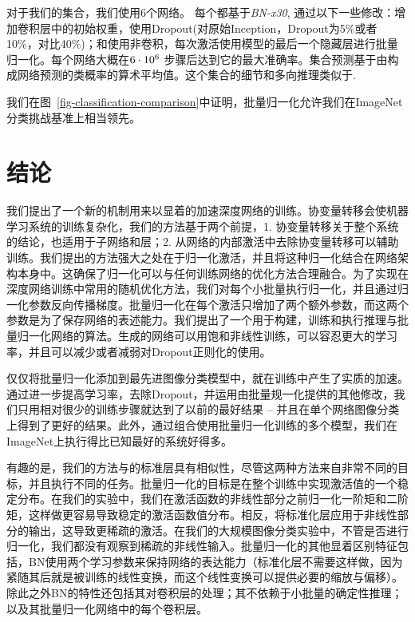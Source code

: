 \documentclass[twocolumn]{article}
\begin{document}

对于我们的集合，我们使用6个网络。 每个都基于{\sl BN-x30},
通过以下一些修改：增加卷积层中的初始权重，使用Dropout(对原始Inception，Dropout为5\%或者10\%，对比40\%)；和使用非卷积，每次激活使用模型的最后一个隐藏层进行批量归一化。每个网络大概在$6\cdot 10^6$ 步骤后达到它的最大准确率。集合预测基于由构成网络预测的类概率的算术平均值。这个集合的细节和多向推理类似于\cite{inception}.

我们在图~\ref{fig-classification-comparison}中证明，批量归一化允许我们在ImageNet分类挑战基准上相当领先。

\section{结论}
我们提出了一个新的机制用来以显着的加速深度网络的训练。协变量转移会使机器学习系统的训练复杂化，我们的方法基于两个前提，1. 协变量转移关于整个系统的结论，也适用于子网络和层；2. 从网络的内部激活中去除协变量转移可以辅助训练。我们提出的方法强大之处在于归一化激活，并且将这种归一化结合在网络架构本身中。这确保了归一化可以与任何训练网络的优化方法合理融合。为了实现在深度网络训练中常用的随机优化方法，我们对每个小批量执行归一化，并且通过归一化参数反向传播梯度。批量归一化在每个激活只增加了两个额外参数，而这两个参数是为了保存网络的表述能力。我们提出了一个用于构建，训练和执行推理与批量归一化网络的算法。生成的网络可以用饱和非线性训练，可以容忍更大的学习率，并且可以减少或者减弱对Dropout正则化的使用。

仅仅将批量归一化添加到最先进图像分类模型中，就在训练中产生了实质的加速。通过进一步提高学习率，去除Dropout，并运用由批量规一化提供的其他修改，我们只用相对很少的训练步骤就达到了以前的最好结果 – 并且在单个网络图像分类上得到了更好的结果。此外，通过组合使用批量归一化训练的多个模型，我们在ImageNet上执行得比已知最好的系统好得多。

有趣的是，我们的方法与\cite{gulcehre}的标准层具有相似性，尽管这两种方法来自非常不同的目标，并且执行不同的任务。批量归一化的目标是在整个训练中实现激活值的一个稳定分布。在我们的实验中，我们在激活函数的非线性部分之前归一化一阶矩和二阶矩，这样做更容易导致稳定的激活函数值分布。相反，\cite{gulcehre}将标准化层应用于非线性部分的输出，这导致更稀疏的激活。在我们的大规模图像分类实验中，不管是否进行归一化，我们都没有观察到稀疏的非线性输入。批量归一化的其他显着区别特征包括，BN使用两个学习参数来保持网络的表达能力（标准化层不需要这样做，因为紧随其后就是被训练的线性变换，而这个线性变换可以提供必要的缩放与偏移）。除此之外BN的特性还包括其对卷积层的处理；其不依赖于小批量的确定性推理；以及其批量归一化网络中的每个卷积层。
\end{document}
